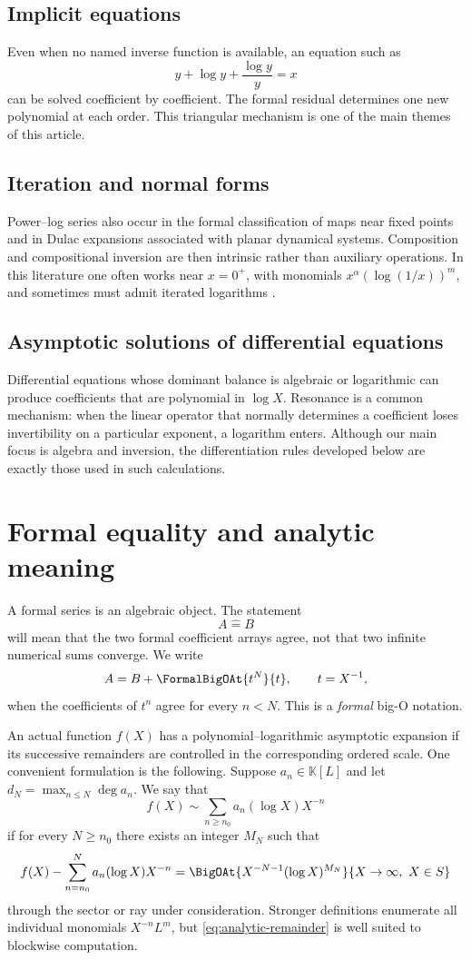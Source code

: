 \documentclass[11pt,openany]{book}
\theoremstyle{definition}
\theoremstyle{plain}
\theoremstyle{remark}
\newcommand{\K}{\mathbb{K}}
\newcommand{\wideeq}{\mathrel{\widehat{=}}}
\begin{document}
\subsection{Implicit equations}
Even when no named inverse function is available, an equation such as
\[
 y+\log y+\frac{\log y}{y}=x
\]
can be solved coefficient by coefficient.  The formal residual determines one
new polynomial at each order.  This triangular mechanism is one of the main
themes of this article.

\subsection{Iteration and normal forms}
Power--log series also occur in the formal classification of maps near fixed
points and in Dulac expansions associated with planar dynamical systems.
Composition and compositional inversion are then intrinsic rather than
auxiliary operations.  In this literature one often works near \(x=0^+\), with
monomials \(x^\alpha(\log(1/x))^m\), and sometimes must admit iterated
logarithms \cite{mardesic-powerlog,mardesic-dulac,peran-logarithmic}.

\subsection{Asymptotic solutions of differential equations}
Differential equations whose dominant balance is algebraic or logarithmic can
produce coefficients that are polynomial in \(\log X\).  Resonance is a common
mechanism: when the linear operator that normally determines a coefficient
loses invertibility on a particular exponent, a logarithm enters.  Although
our main focus is algebra and inversion, the differentiation rules developed
below are exactly those used in such calculations.

\section{Formal equality and analytic meaning}
A formal series is an algebraic object.  The statement
\[
 A\wideeq B
\]
will mean that the two formal coefficient arrays agree, not that two infinite
numerical sums converge.  We write
\[
 A=B+\FormalBigOAt{t^N}{t},\qquad t=X^{-1},
\]
when the coefficients of \(t^n\) agree for every \(n<N\).  This is a
\emph{formal} big-O notation.

An actual function \(f(X)\) has a polynomial--logarithmic asymptotic expansion
if its successive remainders are controlled in the corresponding ordered
scale.  One convenient formulation is the following.  Suppose
\(a_n\in\K[L]\) and let \(d_N=\max_{n\le N}\deg a_n\).  We say that
\[
 f(X)\sim\sum_{n\ge n_0}a_n(\log X)X^{-n}
\]
if for every \(N\ge n_0\) there exists an integer \(M_N\) such that
\begin{equation}\label{eq:analytic-remainder}
 f(X)-\sum_{n=n_0}^{N}a_n(\log X)X^{-n}
 =\BigOAt{X^{-N-1}(\log X)^{M_N}}{X\to\infty,\ X\in S}
\end{equation}
through the sector or ray under consideration.  Stronger definitions enumerate
all individual monomials \(X^{-n}L^m\), but
\cref{eq:analytic-remainder} is well suited to blockwise computation.
\end{document}
